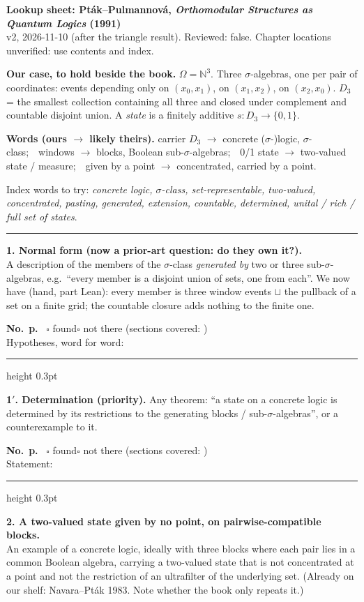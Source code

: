 \documentclass[10pt]{article}
\newcommand{\blank}[1]{\vspace{2pt}\hrule height 0.3pt\vspace{#1}}
\newcommand{\rec}{\textbf{No.}\ \underline{\hspace{2.2cm}}\quad \textbf{p.}\ \underline{\hspace{1.4cm}}\quad
  $\square$ found\quad $\square$ not there (sections covered: \underline{\hspace{3.2cm}})}
\begin{document}
{\large\textbf{Lookup sheet: Pt\'ak--Pulmannov\'a, \emph{Orthomodular Structures as Quantum Logics} (1991)}}\\
{\small v2, 2026-11-10 (after the triangle result). Reviewed: false. Chapter locations unverified: use contents and index.}

\textbf{Our case, to hold beside the book.} $\Omega=\mathbb N^3$. Three $\sigma$-algebras, one per pair of
coordinates: events depending only on $(x_0,x_1)$, on $(x_1,x_2)$, on $(x_2,x_0)$. $D_3$ = the smallest collection
containing all three and closed under complement and countable disjoint union. A \emph{state} is a finitely
additive $s:D_3\to\{0,1\}$.

\textbf{Words (ours $\to$ likely theirs).} carrier $D_3$ $\to$ concrete ($\sigma$-)logic, $\sigma$-class;\ \
windows $\to$ blocks, Boolean sub-$\sigma$-algebras;\ \ 0/1 state $\to$ two-valued state / measure;\ \
given by a point $\to$ concentrated, carried by a point.

Index words to try: \emph{concrete logic, $\sigma$-class, set-representable, two-valued, concentrated,
pasting, generated, extension, countable, determined, unital / rich / full set of states}.

\medskip\hrule\medskip

\textbf{1. Normal form (now a prior-art question: do they own it?).}\\
A description of the members of the $\sigma$-class \emph{generated by} two or three sub-$\sigma$-algebras, e.g.\
``every member is a disjoint union of sets, one from each''. We now have (hand, part Lean): every member is three window events $\sqcup$ the pullback of a set on a finite grid; the countable closure adds nothing to the finite one.

\rec\\ Hypotheses, word for word:
\blank{1.6cm}

\textbf{1$'$. Determination (priority).} Any theorem: ``a state on a concrete logic is determined by its restrictions to
the generating blocks / sub-$\sigma$-algebras'', or a counterexample to it.

\rec\\ Statement:
\blank{1.6cm}

\textbf{2. A two-valued state given by no point, on pairwise-compatible blocks.}\\
An example of a concrete logic, ideally with three blocks where each pair lies in a common Boolean algebra,
carrying a two-valued state that is not concentrated at a point and not the restriction of an ultrafilter of the
underlying set. (Already on our shelf: Navara--Pt\'ak 1983. Note whether the book only repeats it.)
\end{document}
